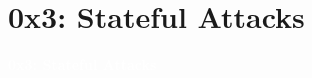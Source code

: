 \documentclass[aspectratio=169]{beamer}
\begin{document}
\section{0x3: Stateful Attacks}
{
\begin{frame}
\huge{\textcolor{white}{\textbf{0x3: Stateful Attacks}}}
\end{frame}
}


\end{document}
